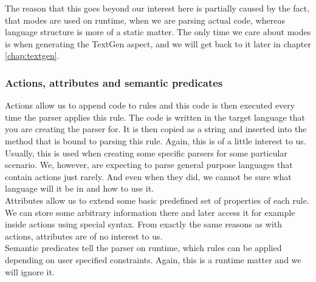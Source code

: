 The reason that this goes beyond our interest here is partially caused by the fact, that modes are used on runtime, when we are parsing actual code, whereas language structure is more of a static matter.
The only time we care about modes is when generating the TextGen aspect, and we will get back to it later in chapter \ref{chap:textgen}.

\subsubsection{Actions, attributes and semantic predicates}

Actions allow us to append code to rules and this code is then executed every time the parser applies this rule.
The code is written in the target language that you are creating the parser for.
It is then copied as a string and inserted into the method that is bound to parsing this rule.
Again, this is of a little interest to us.
Usually, this is used when creating some specific parsers for some particular scenario.
We, however, are expecting to parse general purpose languages that contain actions just rarely.
And even when they did, we cannot be sure what language will it be in and how to use it.
\\

Attributes allow us to extend some basic predefined set of properties of each rule.
We can store some arbitrary information there and later access it for example inside actions using special syntax.
From exactly the same reasons as with actions, attributes are of no interest to us.
\\

Semantic predicates tell the parser on runtime, which rules can be applied depending on user specified constraints.
Again, this is a runtime matter and we will ignore it.
